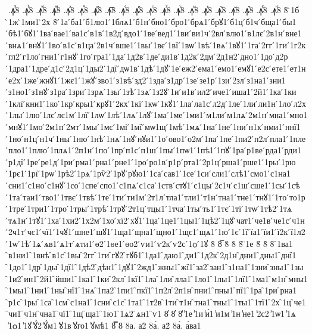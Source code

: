 {.ꙟⷹ8
.ꙟⷺ8
.ꙟⷻ8
.ꙟⷼ8
.ꙟⷽ8
.ꙟⷾ8
.ꙟⷿ8
.ꙟ꙯8
.ꙟꙴ8
.ꙟꙵ8
.ꙟꙶ8
.ꙟꙷ8
.ꙟꙸ8
.ꙟꙹ8
.ꙟꙺ8
.ꙟꙻ8
.ꙟ꙼8
.ꙟ꙽8
.ꙟꚞ8
.ꙟꚟ8
8̀
̀1б
̀1ж
̀1ми1
̀2х
8́
́1а
́ба1
́б1лю1
́1блѧ1
́б1н
́бно1
́бро1
́брѧ1
́брꙋ1
́б1ц
́б1ч
́бща1
́бы1
́бѣ1
́бꙋ1
́1ва
́вае1
́ва1с
́в1в
́1в2д
́вдо1
́1ве
́вед1
́1ви
́ви1ч
́2вл
́влю1
́в1лє
́2в1н
́вне1
́внѧ1
́внꙋ1
́1во
́в1с
́в1ца
́2в1ч
́вше1
́1вы
́1вє
́1вї
́1вѡ
́1вѣ
́1вѧ
́1вꙋ1
́1га
́2гг
́1ги
́1г2к
́гл2
́г1ло
́гни1
́г1нꙋ
́1го
́гра1
́1да
́1д2в
́1де
́ди1в
́1д2к
́2дм
́2д1н2
́дно1
́1до
́д2р
́1дра1
́1дре
́д1с
́2д1ц
́1ды2
́1дї
́дѡ1в
́1дѣ
́1дꙋ
́1е
́еж2
́ема1
́емо1
́емꙋ1
́е2с
́ете1
́ет1н
́е2х
́1же
́жнꙋ1
́1жє1
́1жꙋ
́зво1
́з1вѣ
́зд2
́1зда
́з1др
́1зе
́зе1р
́1зи
́2зл
́з1на1
́зни1
́з1но1
́з1нꙋ
́з1ра
́1зри
́1зрѧ
́1зы
́1зѣ
́1зѧ
́1з2ꙋ
́1и
́и1в
́ил2
́иче1
́иша1
́2й1
́1ка
́1ки
́1клї
́кни1
́1ко
́1кр
́кры1
́крꙋ1
́2кх
́1кї
́1кѡ
́1кꙋ1
́1ла
́ла1с
́л2д
́1ле
́1ли
́ли1н
́1ло
́л2х
́1лы
́1лю
́1лє
́лє1м
́1лї
́1лѡ
́1лѣ
́1лѧ
́1лꙋ
́1ма
́1ме
́1ми1
́м1ли
́м1лѧ
́2м1н
́мна1
́мно1
́мнꙋ1
́1мо
́2м1п
́2мт
́1мы
́1мє
́1мі
́1мї
́мѡ1щ
́1мѣ
́1мѧ
́1на
́1не
́1ни
́н1к
́нми1
́ннї1
́1но
́н1ц
́н1ч
́1ны
́1ню
́1нѣ
́1нѧ
́1нꙋ
́нꙋи1
́1о
́ово1
́о2м
́1па
́1пе
́1пи2
́п2л
́пла1
́1пле
́пло1
́1плю
́1плѧ1
́2п1н
́1по
́1пр
́п1с
́п1ш
́1пы
́1пѡ1
́1пѣ1
́1пꙋ
́1ра
́р1ве
́рда1
́рди1
́р1дї
́1ре
́ре1д
́1ри
́рма1
́рна1
́рне1
́1ро
́ро1в
́р1р
́рта1
́2р1ц
́рша1
́рше1
́1ры
́1рю
́1рє1
́1рї
́1рѡ
́1рѣ2
́1рѧ
́1рѷ2
́1рꙋ
́рꙋю1
́1са
́сав1
́1се
́1си
́сли1
́слѣ1
́смо1
́с1на1
́сни1
́с1но
́с1нꙋ
́1со
́1спе
́спо1
́с1пѧ
́с1са
́1ств
́стꙋ1
́с1цы
́2с1ч
́с1ш
́сше1
́1сы
́1сѣ
́1та
́таи1
́тво1
́1твє
́1твѣ
́1те
́1ти
́ти1м
́2т1л
́тла1
́тли1
́т1н
́тна1
́тне1
́тнꙋ1
́1то
́то1р
́1тре
́1три1
́1тро
́1тры
́1трѣ
́1трꙋ
́2т1ц
́тцы1
́1тча
́1ты
́ть1
́1тє
́1тї
́1тѡ
́1тѣ2
́1тѧ
́тѧ1н
́1тꙋ1
́1ха
́1хи2
́1х2м
́1хо
́хї2
́хꙋ1
́1ца
́1це1
́1цы1
́1цѣ2
́1цꙋ
́чат1
́че1в
́че1с
́ч1н
́2ч1т
́чє1
́чї1
́1чꙋ1
́шне1
́шꙋ1
́1ща1
́щна1
́щно1
́1щє1
́щѧ1
́1ю
́1є
́1ї
́їа1
́їи1
́ї2к
́ї1л2
́1ѡ
́1ѣ
́1ѧ
́ѧв1
́ѧ1т
́ѧти1
́ѳ2
́1ѳе1
́ѳо2
́ѵи1
́ѵ2к
́ѵ2с
́1ѻ
́1ꙋ
8̂
8̅
8̆
8̇
8̈
̈1е
8̋
8̏
8̑
̑1ва1
̑в1ни1
̑1внѣ
̑в1с
̑1вы
̑2гг
̑1ги
̑гꙋ2
̑гꙋб1
̑1да1
̑даю1
̑ди1
̑1д2к
̑2д1н
̑дни1
̑дны1
̑днї1
̑1до1
̑1др
̑1ды
̑1дї1
̑1дѣ2
̑дѣн1
̑1дꙋ1
̑2жд1
̑жны1
̑жї1
̑за2
̑зан1
̑з1на1
̑1зни
̑зны1
̑1зы
̑1и2
̑ин1
̑2й1
̑йши1
̑1ка1
̑1ки
̑2кл
̑1кї1
̑1ла
̑1ли
̑лла1
̑1ло1
̑1лы1
̑1лї1
̑1ма1
̑м1н
̑мны1
̑1мы1
̑1ни1
̑1ны
̑нї1
̑1нѧ
̑1па2
̑1пи1
̑пкї1
̑1п2л
̑2п1н
̑пни1
̑пны1
̑пї1
̑1ра
̑1ри
̑рна1
̑р1с
̑1ры
̑1са
̑1см
̑с1на1
̑1сни
̑с1с
̑1та1
̑1т2в
̑1ти
̑т1н
̑тна1
̑тны1
̑1ты1
̑1тї1
̑2х
̑1ц
̑че1
̑чи1
̑ч1н
̑чна1
̑чї1
̑1щ
̑ща1
̑1ю1
̑1ѧ2
̑ѧн1
̑ѵ1
8̓
8̔
8̾
̾1е
̾1и
̾и́1
̾и1м
̾1н
̾не1
̾2с2
̾1ѡ1
̾1ѧ
̾1ѻ1
̾1ꙋ
̾ꙋ́2
̾ꙋ́м1
̾ꙋ1в
̾ꙋго1
̾ꙋмѣ1
8̿
8͘
8а.
а2̀
8а̀.
а2́
8а́.
а́ва1
}
